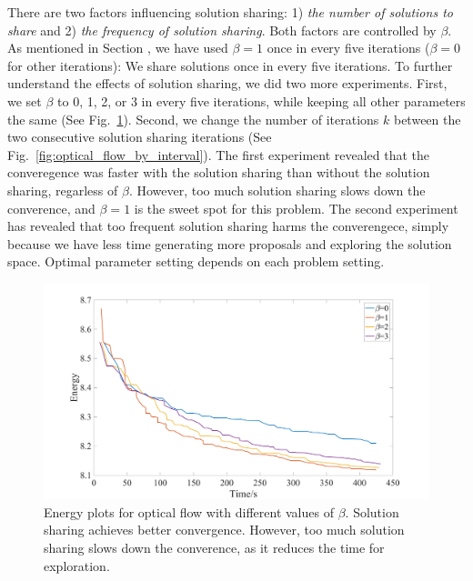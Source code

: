 There are two factors influencing solution sharing: 1) \textit{the number
of solutions to share} and 2) \textit{the frequency of solution
sharing}. Both factors are controlled by $\beta$. As mentioned in
Section \label{optical_flow}, we have used $\beta = 1$ once in every five
iterations ($\beta = 0$ for other iterations): We share solutions once in
every five iterations.  To further understand the effects of solution
sharing, we did two more experiments. First, we set $\beta$ to 0, 1, 2,
or 3 in every five iterations,
while keeping all other parameters the same (See
Fig.~\ref{fig:optical_flow_by_beta}).  Second, we change the number of
iterations $k$ between the two consecutive solution sharing iterations
(See Fig.~\ref{fig:optical_flow_by_interval}).  The first experiment
revealed that the converegence was faster with the solution sharing than
without the solution sharing, regarless of $\beta$.
However, too much solution sharing slows down the converence, and
$\beta=1$ is the sweet spot for this problem.
%
%
The second experiment has revealed that too frequent solution sharing
harms the converengece, simply because we have less time generating more
proposals and exploring the solution space.
Optimal parameter setting depends on each problem setting.
\begin{figure}[tb]
  \includegraphics[width=\columnwidth]{figure/optical_flow_by_beta.png}
  \caption{Energy plots for optical flow with different values of
  $\beta$. Solution sharing achieves better convergence. However, too
  much solution sharing slows down the converence, as it reduces the
 time for exploration.}\label{fig:optical_flow_by_beta}
\end{figure}
